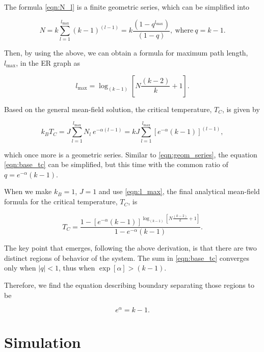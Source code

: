 \documentclass[11pt,a4paper]{article}
\begin{document}
The formula \eqref{eqn:N_l} is a finite geometric series, which can be simplified into

\begin{equation}\label{eqn:geom_series}
    N = k \sum_{l=1}^{l_{\max}} (k-1)^{(l-1)} = k\frac{(1 - q^{l_{\max}})}{(1 - q)},\ \text{where}\ q=k-1.
\end{equation}

Then, by using the above, we can obtain a formula for maximum path length, $l_{\max}$, in the ER graph as

\begin{equation}\label{eqn:l_max}
    l_{\max} = \log_{(k-1)}{\left[N\frac{(k-2)}{k} + 1\right]}.
\end{equation}

Based on the general mean-field solution, the critical temperature, $T_C$, is given by

\begin{equation}\label{eqn:base_tc}
    k_B T_C = J \sum_{l=1}^{l_{\max}} N_l~ e^{-\alpha (l-1)} = kJ \sum_{l=1}^{l_{\max}} \left[e^{-\alpha}(k-1)\right]^{(l-1)},
\end{equation}

which once more is a geometric series. Similar to \eqref{eqn:geom_series}, the equation \eqref{eqn:base_tc} can be simplified, but this time with the common ratio of $q=e^{-\alpha}(k-1)$.

When we make $k_B=1$, $J=1$ and use \eqref{eqn:l_max}, the final analytical mean-field formula for the critical temperature, $T_C$, is

\begin{equation}
    T_C = \frac{1 - [e^{-\alpha}(k-1)]^{\log_{(k-1)}{\left[N\frac{(k-2)}{k} + 1\right]}}}{1 - e^{-\alpha}(k-1)}.
\end{equation}

The key point that emerges, following the above derivation, is that there are two distinct regions of behavior of the system. The sum in \eqref{eqn:base_tc} converges only when $|q|<1$, thus when $\exp[\alpha] > (k-1)$.

Therefore, we find the equation describing boundary separating those regions to be

\begin{equation}
    e^\alpha = k-1.
\end{equation}

\section{Simulation}
\end{document}
